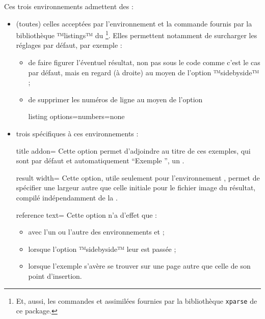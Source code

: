 \documentclass{letgut}
\begin{document}
Ces trois environnements admettent des  :
\begin{itemize}
\item (toutes) celles acceptées par l'environnement
   et la commande 
  fournis par la bibliothèque ™listings™ du
  \footnote{Et, aussi, les commandes
     et assimilées fournies par la bibliothèque
    \lstinline+xparse+ de ce package.}. Elles permettent notamment de surcharger
  les réglages par défaut, par exemple :
  \begin{itemize}
  \item de faire figurer l'éventuel résultat, non pas sous le code comme c'est
    le cas par défaut, mais en regard (à droite) au moyen de l'option
    ™sidebyside™ ;
  \item de supprimer les numéros de ligne au moyen de l'option
\begin{ltx-code}
listing options={numbers=none}
\end{ltx-code}
  \end{itemize}
\item trois spécifiques à ces environnements :
  \begin{docKey}{title addon}{=}{\valinitdef}
    Cette option permet d'adjoindre au titre de ces exemples, qui sont par
    défaut et automatiquement \enquote{Exemple }, un .
  \end{docKey}
  \begin{docKey}{result width}{=}{}
    Cette option, utile seulement pour l'environnement
    , permet de spécifier une largeur autre que
    celle initiale pour le fichier image du résultat, compilé indépendamment de
    la .
  \end{docKey}
  \begin{docKey}{reference text}{=}{}
    Cette option n'a d'effet que :
    \begin{itemize}
    \item avec l'un ou l'autre des environnements  et
       ;
    \item lorsque l'option ™sidebyside™ leur est passée ;
    \item lorsque l'exemple s'avère se trouver sur une page autre que
      celle de son point d'insertion.

\end{itemize}
\end{docKey}
\end{itemize}
\end{document}
